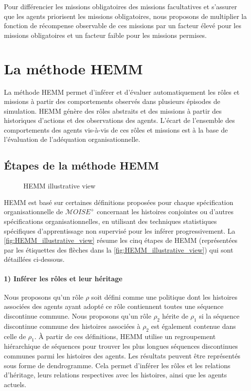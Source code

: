 \documentclass[sigconf,anonymous]{aamas}
\begin{document}
Pour différencier les missions obligatoires des missions facultatives et s'assurer que les agents priorisent les missions obligatoires, nous proposons de multiplier la fonction de récompense observable de ces missions par un facteur élevé pour les missions obligatoires et un facteur faible pour les missions permises.


\section{La méthode HEMM}
\label{sec:hemm_algorithm}
La méthode HEMM permet d'inférer et d'évaluer automatiquement les rôles et missions à partir des comportements observés dans plusieurs épisodes de simulation. HEMM génère des rôles abstraits et des missions à partir des historiques d'actions et des observations des agents. L'écart de l'ensemble des comportements des agents vis-à-vis de ces rôles et missions est à la base de l'évaluation de l'adéquation organisationnelle.

\subsection{Étapes de la méthode HEMM}

\begin{figure*}[h!]
    \centering
    
    \caption{HEMM illustrative view}
    \label{fig:HEMM_illustrative_view}
\end{figure*}

HEMM est basé sur certaines définitions proposées pour chaque spécification organisationnelle de $\mathcal{M}OISE^+$ concernant les histoires conjointes ou d'autres spécifications organisationnelles, en utilisant des techniques statistiques spécifiques d'apprentissage non supervisé pour les inférer progressivement. La \autoref{fig:HEMM_illustrative_view} résume les cinq étapes de HEMM (représentées par les étiquettes des flèches dans la \autoref{fig:HEMM_illustrative_view}) qui sont détaillées ci-dessous.

\paragraph{1) Inférer les rôles et leur héritage}

Nous proposons qu'un rôle $\rho$ soit défini comme une politique dont les histoires associées des agents ayant adopté ce rôle contiennent toutes une séquence discontinue commune. Nous proposons qu'un rôle $\rho_2$ hérite de $\rho_1$ si la séquence discontinue commune des histoires associées à $\rho_2$ est également contenue dans celle de $\rho_1$.
À partir de ces définitions, HEMM utilise un regroupement hiérarchique de séquences pour trouver les plus longues séquences discontinues communes parmi les histoires des agents. Les résultats peuvent être représentés sous forme de dendrogramme. Cela permet d'inférer les rôles et les relations d'héritage, leurs relations respectives avec les histoires, ainsi que les agents actuels.
\end{document}
